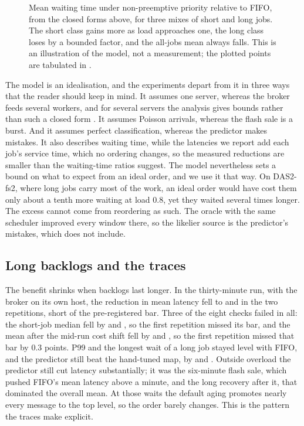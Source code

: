 \begin{figure}[t]
  \centering
  
  \caption{Mean waiting time under non-preemptive priority relative to FIFO, from the closed forms above, for three mixes of short and long jobs. The short class gains more as load approaches one, the long class loses by a bounded factor, and the all-jobs mean always falls. This is an illustration of the model, not a measurement; the plotted points are tabulated in .}\label{fig:cobham}
\end{figure}

The model is an idealisation, and the experiments depart from it in three ways that the reader should keep in mind. It assumes one server, whereas the
broker feeds several workers, and for several servers the analysis gives bounds rather than such a closed form \citep{scully2020gittins}. It assumes Poisson arrivals, whereas the flash sale is a burst. And it assumes perfect classification, whereas
the predictor makes mistakes. It also describes waiting time, while the latencies we report add each job's service time, which no ordering changes, so the measured reductions are smaller than the waiting-time ratios
suggest. The model nevertheless sets a bound on what to expect from an ideal order, and we use it that way. On DAS2-fs2, where long jobs carry most of the
work, an ideal order would have cost them only about a tenth more waiting at load 0.8, yet they waited several times longer. The excess cannot come from reordering as such. The oracle with the same scheduler improved every window there, so
the likelier source is the predictor's mistakes, which  does not include.

\subsection{Long backlogs and the traces}\label{sec:traces}

The benefit shrinks when backlogs last longer. In the thirty-minute run, with the broker on its own host, the reduction in
mean latency fell to \ETwoMeanAAbs{} and \ETwoMeanBAbs{} in the two repetitions, short of the pre-registered bar. Three of the eight checks failed in all: the short-job median fell by \ETwoShortAAbs{} and \ETwoShortBAbs{}, so the first repetition missed its bar, and the mean after the mid-run cost shift fell by \ETwoShiftAAbs{} and \ETwoShiftBAbs{}, so the first repetition missed that bar by 0.3 points. P99 and
the longest wait of a long job stayed level with FIFO, and the predictor still beat the hand-tuned map, by \ETwoTunedAAbs{} and \ETwoTunedBAbs{}. Outside overload the
predictor still cut latency substantially; it was the six-minute flash sale, which pushed FIFO's mean latency above a minute,
and the long recovery after it, that dominated the overall mean. At those waits the default aging promotes nearly every message to the
top level, so the order barely changes. This is the pattern the traces make explicit.


